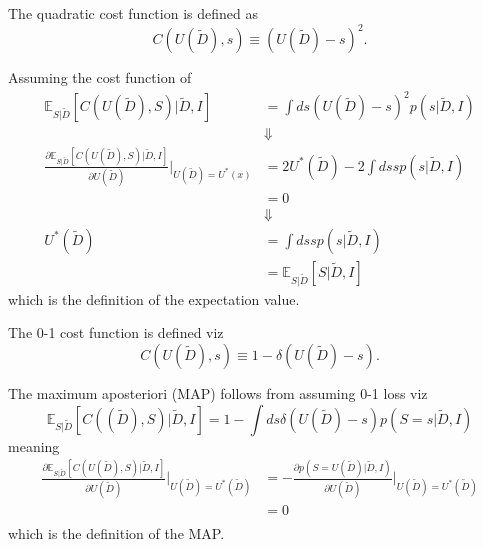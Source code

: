 \begin{definition}
	\label{def:quadratic_cost}
	The quadratic cost function is defined as
	\begin{equation}
		C(U(\tilde{D}),s) \equiv (U(\tilde{D})-s)^2.
	\end{equation}
\end{definition}

\begin{theorem}
	\label{theorem:expectation_decision_rule}
	Assuming the cost function of 
	\begin{equation}
		\begin{split}
			\mathbb{E}_{S|\tilde{D}}[C(U(\tilde{D}), S)|\tilde{D},I] &= \int ds (U(\tilde{D})-s)^2 p(s|\tilde{D},I)\\
			&\Downarrow\\
			\frac{\partial \mathbb{E}_{S|\tilde{D}}[C(U(\tilde{D}), S)|\tilde{D},I]}{\partial U(\tilde{D})}\bigg|_{U(\tilde{D})=U^*(x)} &= 2U^*(\tilde{D})-2\int ds sp(s|\tilde{D},I)\\
			&=0\\
			&\Downarrow\\
			U^*(\tilde{D})& = \int ds sp(s|\tilde{D},I)\\
			&= \mathbb{E}_{S|\tilde{D}}[S|\tilde{D},I]
		\end{split}
	\end{equation}
	which is the definition of the expectation value.
\end{theorem}

\begin{definition}
	\label{def:0_1_cost_function}
	The 0-1 cost function is defined viz
	\begin{equation}
		C(U(\tilde{D}),s) \equiv 1-\delta(U(\tilde{D})-s).
	\end{equation}
\end{definition}

\begin{theorem}
	\label{theorem:MAP}
	The maximum aposteriori (MAP) follows from assuming 0-1 loss viz
	\begin{equation}
		\mathbb{E}_{S|\tilde{D}}[C((\tilde{D}), S)|\tilde{D},I] = 1-\int ds \delta(U(\tilde{D})-s) p(S = s|\tilde{D},I)
	\end{equation}
	meaning
	\begin{equation}
		\begin{split}
			\frac{\partial \mathbb{E}_{S|\tilde{D}}[C(U(\tilde{D}), S)|\tilde{D},I]}{\partial U(\tilde{D})}\bigg|_{U(\tilde{D})=U^*(\tilde{D})} &= -\frac{\partial p(S = U(\tilde{D})|\tilde{D},I)}{\partial U(\tilde{D})}\bigg|_{U(\tilde{D})=U^*(\tilde{D})}\\
			&=0\\
		\end{split}
	\end{equation}
	which is the definition of the MAP.
\end{theorem}


